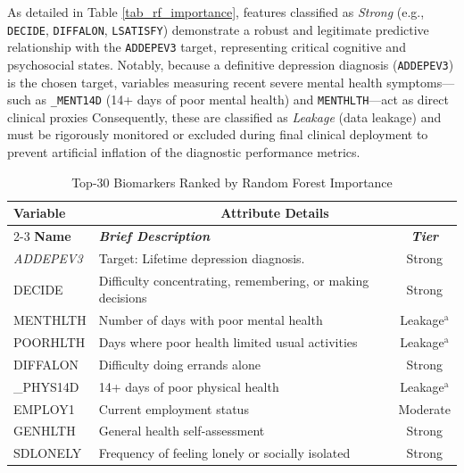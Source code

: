 \documentclass[conference]{IEEEtran}
\begin{document}
As detailed in Table \ref{tab_rf_importance}, features classified as \textit{Strong} (e.g., \texttt{DECIDE}, \texttt{DIFFALON}, \texttt{LSATISFY}) demonstrate a robust and legitimate predictive relationship with the \texttt{ADDEPEV3} target, representing critical cognitive and psychosocial states. Notably, because a definitive depression diagnosis (\texttt{ADDEPEV3}) is the chosen target, variables measuring recent severe mental health symptoms---such as \texttt{\_MENT14D} (14+ days of poor mental health) and \texttt{MENTHLTH}---act as direct clinical proxies %
Consequently, these are classified as \textit{Leakage} (data leakage) and must be rigorously monitored or excluded during final clinical deployment to prevent artificial inflation of the diagnostic performance metrics.
\begin{table}[htbp]
\caption{Top-30 Biomarkers Ranked by Random Forest Importance}
\begin{center}
\begin{tabular}{|l|p{4.5cm}|c|}
\hline
\textbf{Variable}&\multicolumn{2}{|c|}{\textbf{Attribute Details}} \\
\cline{2-3} 
\textbf{Name} & \textbf{\textit{Brief Description}}& \textbf{\textit{Tier}} \\
\hline
\textit{ADDEPEV3} & Target: Lifetime depression diagnosis. & Strong \\
DECIDE & Difficulty concentrating, remembering, or making decisions & Strong \\

MENTHLTH & Number of days with poor mental health & Leakage$^{\mathrm{a}}$ \\

POORHLTH & Days where poor health limited usual activities & Leakage$^{\mathrm{a}}$ \\

DIFFALON & Difficulty doing errands alone & Strong \\

\_PHYS14D & 14+ days of poor physical health & Leakage$^{\mathrm{a}}$ \\

EMPLOY1 & Current employment status & Moderate \\

GENHLTH & General health self-assessment & Strong \\

SDLONELY & Frequency of feeling lonely or socially isolated & Strong \\


\end{tabular}
\end{center}
\end{table}
\end{document}
